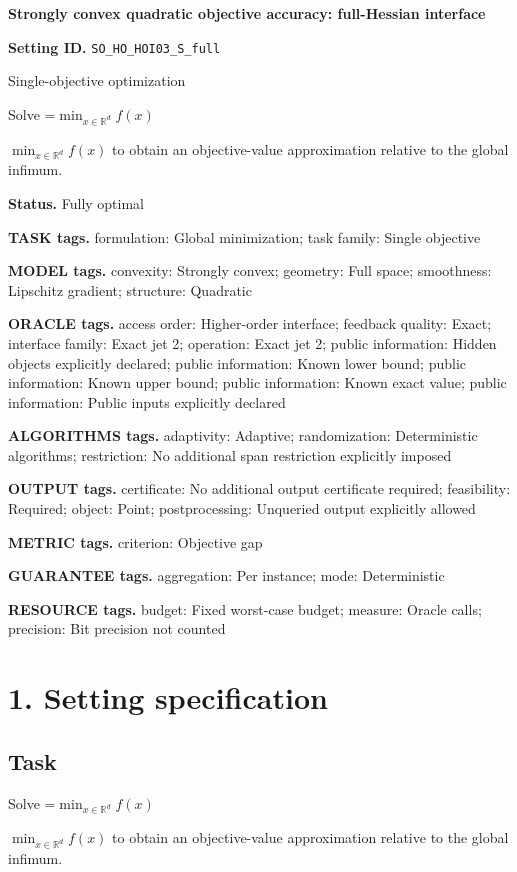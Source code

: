 \documentclass[10pt,a4paper]{article}
\newcommand{\AtlasMath}[1]{\par\begingroup\centering\setbox0=\hbox{$\displaystyle #1$}\ifdim\wd0>1.4\linewidth\typeout{ATLAS WIDE FORMULA: \the\wd0}\fi\ifdim\wd0>\linewidth\resizebox{\linewidth}{!}{\box0}\else\box0\fi\par\endgroup}
\newcommand{\AtlasInlineMath}[1]{\begingroup\setbox0=\hbox{$#1$}\ifdim\wd0>.4\linewidth\endgroup\AtlasMath{#1}\else\endgroup$#1$\fi}
\begin{document}
\raggedright

{\LARGE\bfseries\sffamily\color{AtlasNavy} Strongly convex quadratic objective accuracy: full-Hessian interface\par}\vspace{5pt}
\textbf{Setting ID.} \texttt{SO\_\allowbreak{}\allowbreak{}HO\_\allowbreak{}\allowbreak{}HOI03\_\allowbreak{}\allowbreak{}S\_\allowbreak{}\allowbreak{}full}

Single-objective optimization

Solve \AtlasInlineMath{\min_{x\in \mathbb{R}^d}f(x)} to obtain an objective-value approximation relative to the global infimum.

\textbf{Status.} Fully optimal

\textbf{TASK tags.} formulation: Global minimization; task family: Single objective

\textbf{MODEL tags.} convexity: Strongly convex; geometry: Full space; smoothness: Lipschitz gradient; structure: Quadratic

\textbf{ORACLE tags.} access order: Higher-order interface; feedback quality: Exact; interface family: Exact jet 2; operation: Exact jet 2; public information: Hidden objects explicitly declared; public information: Known lower bound; public information: Known upper bound; public information: Known exact value; public information: Public inputs explicitly declared

\textbf{ALGORITHMS tags.} adaptivity: Adaptive; randomization: Deterministic algorithms; restriction: No additional span restriction explicitly imposed

\textbf{OUTPUT tags.} certificate: No additional output certificate required; feasibility: Required; object: Point; postprocessing: Unqueried output explicitly allowed

\textbf{METRIC tags.} criterion: Objective gap

\textbf{GUARANTEE tags.} aggregation: Per instance; mode: Deterministic

\textbf{RESOURCE tags.} budget: Fixed worst-case budget; measure: Oracle calls; precision: Bit precision not counted

\section{1. Setting specification}
\subsection{Task}
Solve \AtlasInlineMath{\min_{x\in \mathbb{R}^d}f(x)} to obtain an objective-value approximation relative to the global infimum.
\end{document}
